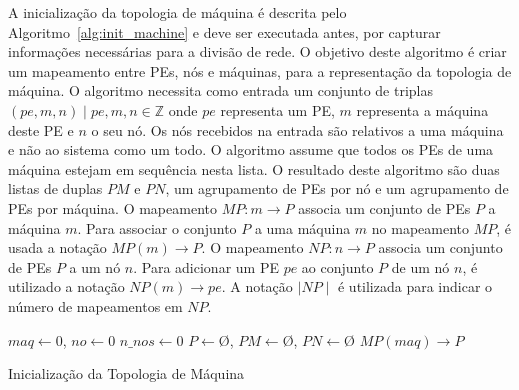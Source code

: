 A inicialização da topologia de máquina é descrita pelo Algoritmo~\ref{alg:init_machine} e deve ser executada antes, por capturar informações necessárias para a divisão de rede.
O objetivo deste algoritmo é criar um mapeamento entre PEs, nós e máquinas, para a representação da topologia de máquina.
O algoritmo necessita como entrada um conjunto de triplas $(pe, m, n) \mid pe, m, n \in \mathbb{Z}$ onde $pe$ representa um PE, $m$ representa a máquina deste PE e $n$ o seu nó. 
Os nós recebidos na entrada são relativos a uma máquina e não ao sistema como um todo.
O algoritmo assume que todos os PEs de uma máquina estejam em sequência nesta lista.
O resultado deste algoritmo são duas listas de duplas $PM$ e $PN$, um agrupamento de PEs por nó e um agrupamento de PEs por máquina.
O mapeamento $MP:m\rightarrow P$ associa um conjunto de PEs $P$ a máquina $m$.
Para associar o conjunto $P$ a uma máquina $m$ no mapeamento $MP$, é usada a notação $MP(m) \rightarrow P$.
O mapeamento $NP:n\rightarrow P$ associa um conjunto de PEs $P$ a um nó $n$.
Para adicionar um PE $pe$ ao conjunto $P$ de um nó $n$, é utilizado a notação $NP(m) \rightarrow pe$.
A notação $\mid NP \mid$ é utilizada para indicar o número de mapeamentos em $NP$.

\begin{algorithm}[t]
    \DontPrintSemicolon

    \BlankLine
    $maq \leftarrow 0$, \xspace 
    $no \leftarrow 0$ 
    $n\_nos \leftarrow 0$\;
    $P \leftarrow $\O, \xspace
    $PM \leftarrow $\O, \xspace
    $PN \leftarrow $\O\;
    $MP(maq) \rightarrow P$\;
    
\caption{Inicialização da Topologia de Máquina}
\label{alg:init_machine}
\end{algorithm}

